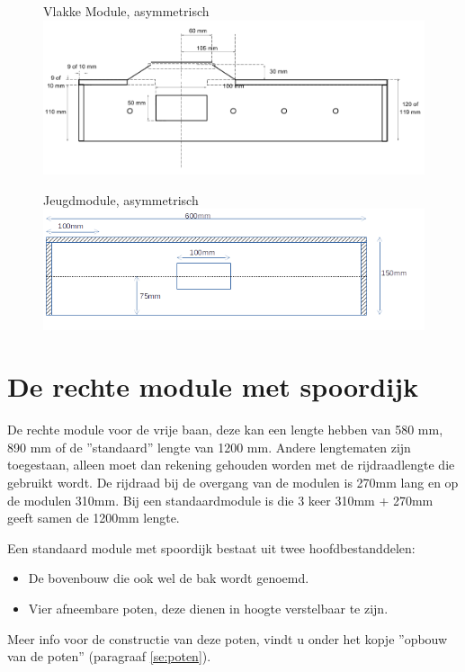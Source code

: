 \documentclass[12pt,a4paper]{report}
\begin{document}
\begin{figure}[!ht]
  \captionbox
  {Vlakke Module, asymmetrisch}
  {\includegraphics[scale=0.25]{images/rcu_vlak_asym}}
\end{figure}

\begin{figure}[!ht]
  \captionbox
  {Jeugdmodule, asymmetrisch\label{im:jeugdbak}}
  {\includegraphics[scale=0.9]{images/jeugdbak}}
\end{figure}

\section{De rechte module met spoordijk}
De rechte module voor de vrije baan, deze kan een lengte hebben van 580 mm, 890 mm of de ''standaard'' lengte van 1200 mm.
Andere lengtematen zijn toegestaan, alleen moet dan rekening gehouden worden met de rijdraadlengte die gebruikt wordt. De rijdraad bij de overgang van de modulen is 270mm lang en op de modulen 310mm.
Bij een standaardmodule is die 3 keer 310mm + 270mm geeft samen de 1200mm lengte.

Een standaard module met spoordijk bestaat uit twee hoofdbestanddelen:
\begin{itemize}
\item De bovenbouw die ook wel de bak wordt genoemd.
\item Vier afneembare poten, deze dienen in hoogte verstelbaar te zijn.
\end{itemize}
Meer info voor de constructie van deze poten, vindt u onder het kopje ''opbouw van de poten'' (paragraaf \ref{se:poten}).
\end{document}
